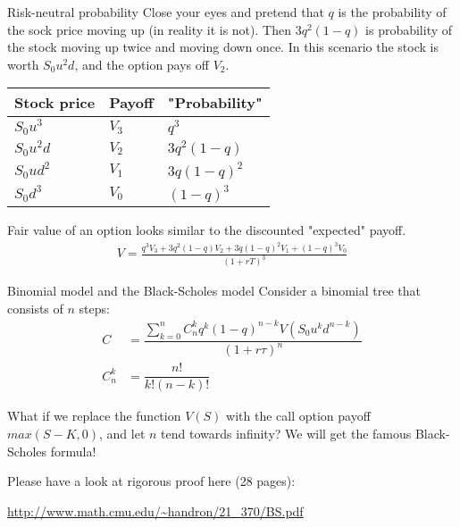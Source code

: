 \documentclass{beamer}
\begin{document}
\begin{frame}{Risk-neutral probability}
\justify
Close your eyes and pretend that $q$ is the probability of the sock price moving up (in reality it is not). Then $3q^2(1-q)$ is probability of the stock moving up twice and moving down once. In this scenario the stock is worth  $S_0u^2d$, and the option pays off $V_2$.

\justify
\centering
\begin{tabular}{l|l|l}
Stock price & Payoff & "Probability" \\ \hline
$S_0u^3$   & $V_3$   & $q^3$ \\
$S_0u^2d$  & $V_2$   & $3q^2(1-q)$ \\
$S_0ud^2$  & $V_1$   & $3q(1-q)^2$ \\ 
$S_0d^3$   & $V_0$   & $(1-q)^3$ 
\end{tabular}

\justify
Fair value of an option looks similar to the discounted "expected" payoff.
\begin{align*}
V = \frac{q^3V_3 + 3q^2(1-q)V_2 + 3q(1-q)^2V_1 + (1-q)^3V_0}{(1+rT)^3}
\end{align*}
\end{frame}



\begin{frame}{Binomial model and the Black-Scholes model}
Consider a binomial tree that consists of $n$ steps:
\begin{align*}
C &= \dfrac{\sum\limits_{k=0}^{n} C^k_nq^k(1-q)^{n-k}V(S_0u^kd^{n-k})}{(1+r\tau)^n} \\
C^k_n &= \dfrac{n!}{k!(n-k)!}
\end{align*}

\justify
What if we replace the function $V(S)$ with the call option payoff $max(S-K,0)$, and let $n$ tend towards infinity? We will get the famous Black-Scholes formula!

\justify
Please have a look at rigorous proof here (28 pages):

\url{http://www.math.cmu.edu/~handron/21_370/BS.pdf}
\end{frame}
\end{document}
